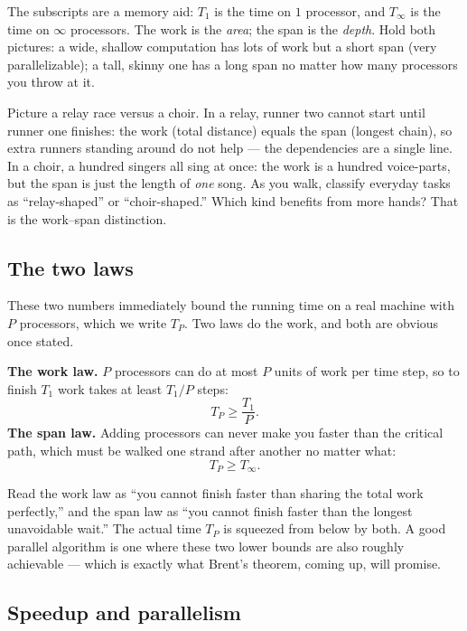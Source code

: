 The subscripts are a memory aid: $T_1$ is the time on $1$ processor, and
$T_\infty$ is the time on $\infty$ processors. The work is the \emph{area}; the
span is the \emph{depth}. Hold both pictures: a wide, shallow computation has lots
of work but a short span (very parallelizable); a tall, skinny one has a long span
no matter how many processors you throw at it.

\begin{walkbox}
Picture a relay race versus a choir. In a relay, runner two cannot start until
runner one finishes: the work (total distance) equals the span (longest chain), so
extra runners standing around do not help --- the dependencies are a single line.
In a choir, a hundred singers all sing at once: the work is a hundred voice-parts,
but the span is just the length of \emph{one} song. As you walk, classify
everyday tasks as ``relay-shaped'' or ``choir-shaped.'' Which kind benefits from
more hands? That is the work--span distinction.
\end{walkbox}

\subsection{The two laws}

These two numbers immediately bound the running time on a real machine with $P$
processors, which we write $T_P$. Two laws do the work, and both are obvious once
stated.

\begin{formalbox}
\textbf{The work law.} $P$ processors can do at most $P$ units of work per time
step, so to finish $T_1$ work takes at least $T_1/P$ steps:
\[
T_P \ge \frac{T_1}{P}.
\]
\textbf{The span law.} Adding processors can never make you faster than the
critical path, which must be walked one strand after another no matter what:
\[
T_P \ge T_\infty.
\]
\end{formalbox}

Read the work law as ``you cannot finish faster than sharing the total work
perfectly,'' and the span law as ``you cannot finish faster than the longest
unavoidable wait.'' The actual time $T_P$ is squeezed from below by both. A good
parallel algorithm is one where these two lower bounds are also roughly
achievable --- which is exactly what Brent's theorem, coming up, will promise.

\subsection{Speedup and parallelism}

